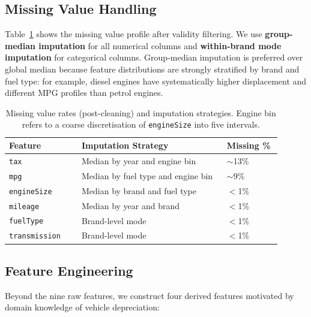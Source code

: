 \subsection{Missing Value Handling}
\label{sec:imputation}

Table~\ref{tab:missing} shows the missing value profile after validity filtering.
We use \textbf{group-median imputation} for all numerical columns and \textbf{within-brand mode imputation} for categorical columns.
Group-median imputation is preferred over global median because feature distributions are strongly stratified by brand and fuel type: for example, diesel engines have systematically higher displacement and different MPG profiles than petrol engines.

\begin{table}[h]
\centering
\begingroup
\setlength{\tabcolsep}{3pt}
\small
\begin{tabular}{@{}p{0.24\linewidth}p{0.48\linewidth}p{0.18\linewidth}@{}}
\toprule
\textbf{Feature} & \textbf{Imputation Strategy} & \textbf{Missing \%} \\
\midrule
\texttt{tax}          & Median by year and engine bin       & $\sim$13\% \\
\texttt{mpg}          & Median by fuel type and engine bin  & $\sim$9\%  \\
\texttt{engineSize}   & Median by brand and fuel type       & $<$1\%  \\
\texttt{mileage}      & Median by year and brand            & $<$1\%  \\
\texttt{fuelType}     & Brand-level mode                    & $<$1\%  \\
\texttt{transmission} & Brand-level mode                    & $<$1\%  \\
\bottomrule
\end{tabular}
\endgroup
\caption{Missing value rates (post-cleaning) and imputation strategies. Engine bin refers to a coarse discretisation of \texttt{engineSize} into five intervals.}
\label{tab:missing}
\end{table}

\subsection{Feature Engineering}
\label{sec:feature_engineering}

Beyond the nine raw features, we construct four derived features motivated by domain knowledge of vehicle depreciation:

